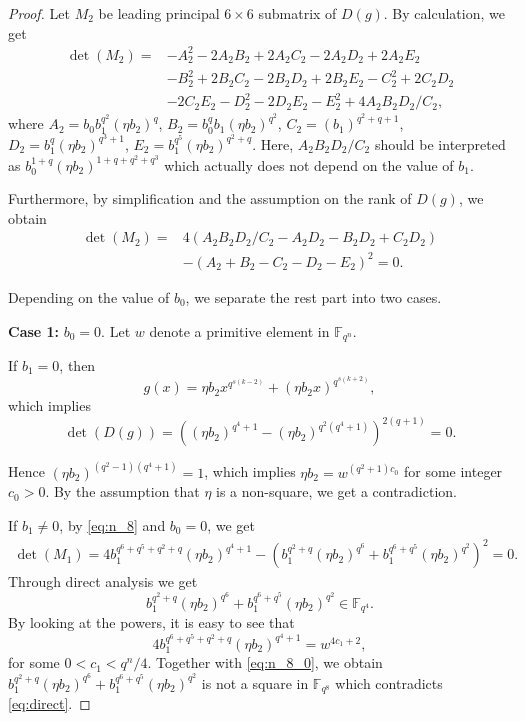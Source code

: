 \documentclass{amsart}
\theoremstyle{plain}
\theoremstyle{definition}
\newcommand{\F}{\mathbb F}
\newcommand{\fqn}{\mathbb{F}_{q^n}}
\begin{document}
\begin{proof}
		
		
		Let $M_2$ be leading principal $6\times 6$ submatrix of $D( g)$.
		By calculation, we get
		\begin{align*}
			\det(M_2)=&-A_2^2-2A_2B_2+2A_2C_2-2A_2D_2+2A_2E_2\\
			&-B_2^2+2B_2C_2-2B_2D_2+2B_2E_2-C_2^2+2C_2D_2\\
			&-2C_2E_2-D_2^2-2D_2E_2-E_2^2+4A_2B_2D_2/C_2,
		\end{align*}
		where $A_2=b_0b_1^{q^2}(\eta b_2)^q$, $B_2=b_0^qb_1(\eta b_2)^{q^2}$, $C_2=(b_1)^{q^2+q+1}$, $D_2=b_1^q(\eta b_2)^{q^3+1}$, $E_2=b_1^{q^5}(\eta b_2)^{q^2+q}$. Here, $A_2B_2D_2/C_2$ should be interpreted as $b_0^{1+q}(\eta b_2)^{1+q+q^2+q^3}$ which actually does not depend on the value of $b_1$.
		
		Furthermore, by simplification and the assumption on the rank of $D( g)$, we obtain
		\begin{align}
			\nonumber
			\det(M_2)=&4\left(A_2B_2D_2/C_2-A_2D_2-B_2D_2+C_2D_2\right)\\
			\label{eq:n_8,1}
			&-(A_2+B_2-C_2-D_2-E_2)^2=0.
		\end{align}
		
		
		Depending on the value of $b_0$, we separate the rest part into two cases.
		
		\medskip
		
		\noindent\textbf{Case 1:} $b_0=0$.
		Let $w$ denote a primitive element in $\fqn$.
		
		If $b_1= 0$, then 
		\[ g(x)=\eta b_2x^{q^{s(k-2)}}+(\eta b_2x)^{q^{s(k+2)}},\]
		which implies
		\[\det(D( g))=\left((\eta b_2)^{q^4+1}-(\eta b_2)^{q^2(q^4+1)}\right)^{2(q+1)}=0.\]
		
		Hence $(\eta b_2)^{(q^2-1)(q^4+1)}=1$, which implies $\eta b_2=w^{(q^2+1)c_0}$ for some integer $c_0>0$.
		By the assumption that $\eta$ is a non-square, we get a contradiction.
		
		If $b_1\neq 0$,	by \eqref{eq:n_8} and $b_0=0$, we get \begin{align}\label{eq:n_8_0}
			\det(M_1)=4b_1^{q^6+q^5+q^2+q}(\eta b_2)^{q^4+1}-\left(b_1^{q^2+q}(\eta b_2)^{q^6}+b_1^{q^6+q^5}(\eta b_2)^{q^2}\right)^2=0.
		\end{align}
		Through direct analysis we get
		\begin{equation}\label{eq:direct}
			b_1^{q^2+q}(\eta b_2)^{q^6}+b_1^{q^6+q^5}(\eta b_2)^{q^2}\in\F_{q^4}.
		\end{equation}
		By looking at the powers, it is easy to see that
		$$4b_1^{q^6+q^5+q^2+q}(\eta b_2)^{q^4+1}=w^{4c_1+2},$$
		for some $0<c_1<q^n/4$.
		Together with \eqref{eq:n_8_0}, we obtain $b_1^{q^2+q}(\eta b_2)^{q^6}+b_1^{q^6+q^5}(\eta b_2)^{q^2}$ is not a square in $\F_{q^8}$ which contradicts \eqref{eq:direct}. 
		

\end{proof}
\end{document}
